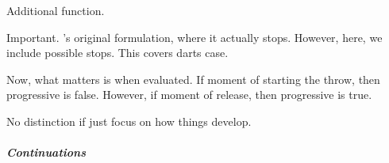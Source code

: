 \begin{note}
  Additional function.

  \begin{algorithm}[H]
    \SetAlgoLined
    \DontPrintSemicolon
    \caption{\AlgPC{}\label{PrAl:g-p-c}}
  \end{algorithm}

  Important.
  \citeauthor{Landman:1992wh}'s original formulation, where it actually stops.
  However, here, we include possible stops.
  This covers darts case.

  Now, what matters is when evaluated.
  If moment of starting the throw, then progressive is false.
  However, if moment of release, then progressive is true.

  No distinction if just focus on how things develop.
\end{note}

\subparagraph{Continuations}

\begin{note}
  \begin{algorithm}[H]
    \SetAlgoLined
    \DontPrintSemicolon
    \caption{\AlgGetCs{}\label{PrAl:g-c}}
  \end{algorithm}
\end{note}

